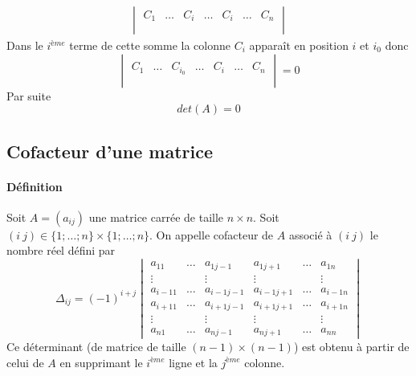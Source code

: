 \begin{itemize}
\begin{eqnarray*}
\begin{vmatrix}
          C_1 & \ldots & C_{i} & \ldots & C_i & \ldots & C_n 
        \\ \\ \end{vmatrix}
    \end{eqnarray*}
    Dans le $i^{ème}$ terme de cette somme la colonne $C_i$ apparaît en position $i$ et $i_0$ donc
    $$\begin{vmatrix} \\ C_1 & \ldots & C_{i_0} & \ldots & C_i & \ldots & C_n \\ \\ \end{vmatrix} = 0$$
    Par suite
    $$det(A) = 0$$
\end{itemize}

%
\subsection{Cofacteur d'une matrice}
%
\paragraph{Définition} Soit $A = (a_{ij})$ une matrice carrée de taille $n\times n$. Soit $(i ~ j) \in \{1; \ldots; n\} \times \{1; \ldots; n \}$. On appelle cofacteur de $A$ associé à $(i ~ j)$ le nombre réel défini par
$$\Delta_{ij} = (-1)^{i+j} \begin{vmatrix}
  a_{11} & \ldots & a_{1 j-1} & a_{1 j+1} & \ldots & a_{1n} \\
  \vdots &  & \vdots & \vdots &  & \vdots \\
  a_{i-1 1} & \ldots & a_{i-1 j-1} & a_{i-1 j+1} & \ldots & a_{i-1 n} \\
  a_{i+1 1} & \ldots & a_{i+1 j-1} & a_{i+1 j+1} & \ldots & a_{i+1 n} \\
  \vdots &  & \vdots & \vdots &  & \vdots \\
  a_{n 1} & \ldots & a_{n j-1} & a_{n j+1} & \ldots & a_{nn}
\end{vmatrix}$$
Ce déterminant (de matrice de taille $(n-1) \times (n-1)$) est obtenu à partir de celui de $A$ en supprimant le $i^{ème}$ ligne et la $j^{ème}$ colonne.

